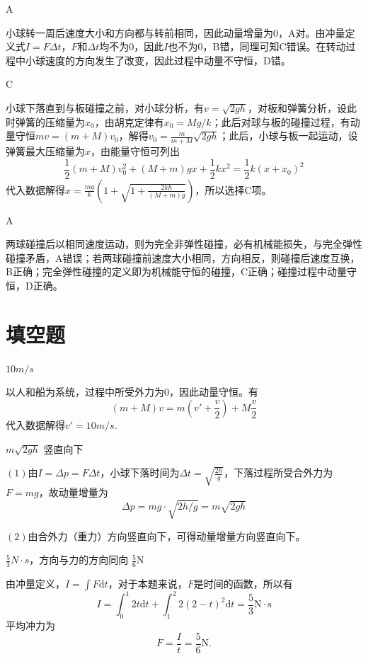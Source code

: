 \documentclass[b5paper,opensource,sourcefont,parskip]{qyxf-book}
\newcommand{\di}[1]{\mathrm{d}#1}
\begin{document}
A

\solve 小球转一周后速度大小和方向都与转前相同，因此动量增量为0，A对。由冲量定义式\(I=F\Delta t\)，\(F\)和\(\Delta t\)均不为0，因此\(I\)也不为0，B错，同理可知C错误。在转动过程中小球速度的方向发生了改变，因此过程中动量不守恒，D错。
			
C
			
\solve 小球下落直到与板碰撞之前，对小球分析，有\(v=\sqrt{2gh}\)，对板和弹簧分析，设此时弹簧的压缩量为\(x_0\)，由胡克定律有\(x_0=Mg/k\)；此后对球与板的碰撞过程，有动量守恒\(mv=(m+M)v_0\)，解得\(v_0=\frac{m}{m+M}\sqrt{2gh}\)；此后，小球与板一起运动，设弹簧最大压缩量为\(x\)，由能量守恒可列出
\[\frac{1}{2}(m+M)v_0^2+(M+m)gx+\frac{1}{2}kx^2=\frac{1}{2}k(x+x_0)^2\]
代入数据解得\(x=\frac{mg}{k}(1+\sqrt{1+\frac{2kh}{(M+m)g}})\)，所以选择C项。
			
A
			
\solve 两球碰撞后以相同速度运动，则为完全非弹性碰撞，必有机械能损失，与完全弹性碰撞矛盾，A错误；若两球碰撞前速度大小相同，方向相反，则碰撞后速度互换，B正确；完全弹性碰撞的定义即为机械能守恒的碰撞，C正确；碰撞过程中动量守恒，D正确。

\section{填空题}
$10m/s$

\solve 以人和船为系统，过程中所受外力为$ 0 $，因此动量守恒。有
\begin{equation*}
(m+M)v=m(v'+\frac{v}{2})+M\frac{v}{2} 
\end{equation*}
代入数据解得$ v'=10m/s $.

$ m\sqrt{2gh} $ \hspace{2em} 竖直向下

\solve $(1)$由$ I=\Delta p=F\Delta t $，小球下落时间为$\Delta t=\sqrt{\frac{2h}{g}}$，下落过程所受合外力为$F=mg$，故动量增量为
\begin{equation*}
\Delta p=mg\cdot\sqrt{2h/g}=m\sqrt{2gh}
\end{equation*}

$(2)$由合外力（重力）方向竖直向下，可得动量增量方向竖直向下。

$\frac{5}{3}N\cdot s$，方向与力的方向同向 \hspace{2em} $\frac{5}{6}$N

\solve 由冲量定义，$I = \int F \di t$，对于本题来说，$F$是时间的函数，所以有
\begin{equation*}
I = \int_0^1 2t \di t + \int_1^2 2(2-t)^2 \di t = \frac{5}{3}\text{N} \cdot \text{s}
\end{equation*}
平均冲力为
\begin{equation*}
\overline{F} = \frac{I}{t} = \frac{5}{6} \text{N}.
\end{equation*}
\end{document}
